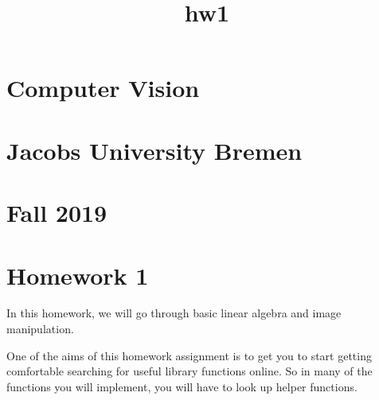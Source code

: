 \documentclass[11pt]{article}
\title{hw1}
\begin{document}
    
    
    \maketitle
    
    

    
    \hypertarget{computer-vision}{%
\section{Computer Vision}\label{computer-vision}}

\hypertarget{jacobs-university-bremen}{%
\section{Jacobs University Bremen}\label{jacobs-university-bremen}}

\hypertarget{fall-2019}{%
\section{Fall 2019}\label{fall-2019}}

\hypertarget{homework-1}{%
\section{Homework 1}\label{homework-1}}

In this homework, we will go through basic linear algebra and image
manipulation.

One of the aims of this homework assignment is to get you to start
getting comfortable searching for useful library functions online. So in
many of the functions you will implement, you will have to look up
helper functions.
\end{document}

